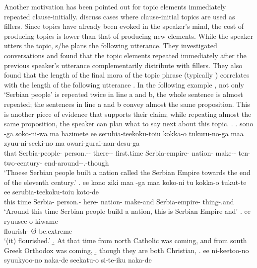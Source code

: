 Another motivation has been pointed out for topic elements immediately repeated clause-initially.
 discuss cases where clause-initial topics are used as fillers.
Since topics have already been evoked in the speaker's mind, the cost of producing topics is lower than that of producing new elements.
While the speaker utters the topic,
s/he plans the following utterance.
They investigated conversations and found that the topic elements repeated immediately after the previous speaker's utterance
complementarily distribute with fillers.
They also found that the length of the final mora of the topic phrase (typically ) correlates with the length of the following utterance
\cite[see also][]{watanabeden10}.
In the following example \Next,
not only `Serbian people' is repeated twice in line a and b,
the whole sentence is almost repeated;
the sentences in line a and b convey almost the same proposition.
This is another piece of evidence that supports their claim;
while repeating almost the same proposition,
the speaker can plan what to say next about this topic.
%
\ex.
 \ag. sono  -ga soko-ni-wa ma hazimete ee serubia-teekoku-toiu kokka-o tukuru-no-ga maa zyuu-ni-seeki-no ma owari-gurai-nan-desu-ga \\
 	that Serbia-people- person.-- there--  first.time  Serbia-empire- nation- make--  ten-two-century-  end-around--.-though \\
	`Thoese Serbian people built a nation called the Serbian Empire towards the end of the eleventh century.'
 \bg. ee kono ziki maa  -ga maa koko-ni tu kokka-o tukut-te ee serubia-teekoku-toiu koto-de \\
 	 this time  Serbia- person.-  here-  nation- make-and  Serbia-empire- thing-.and \\
	`Around this time Serbian people build a nation, this is Serbian Empire and'
 \bg. ee ryuusee-o \EM{\O} kiwame \\
 		 flourish- {\O} be.extreme \\
	`(it) flourished.'
 \b. At that time from north Catholic was coming, and from south Greek Orthodox was coming,
 \b. though they are both Christian,
 \bg. ee ni-keetoo-no syuukyoo-no naka-de seekatu-o \EM{\O} si-te-iku naka-de \\
